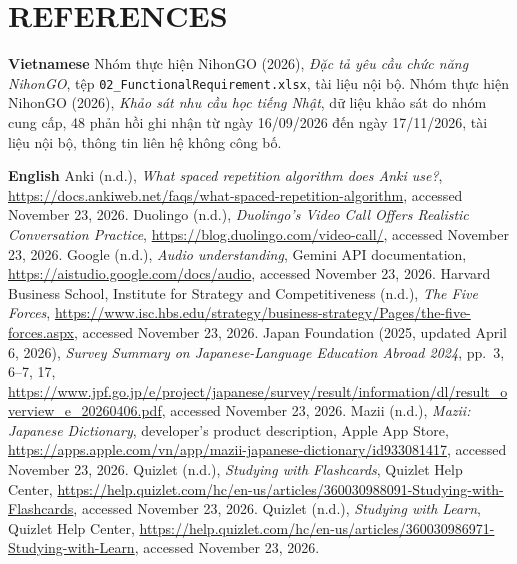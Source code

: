 {}
\chapter*{REFERENCES}

\begin{refslist}
  \item[] \hspace*{-0.68cm}\textbf{Vietnamese}
   Nhóm thực hiện NihonGO (2026),
    \textit{Đặc tả yêu cầu chức năng NihonGO}, tệp
    \nolinkurl{02_FunctionalRequirement.xlsx}, tài liệu nội bộ.
   Nhóm thực hiện NihonGO (2026),
    \textit{Khảo sát nhu cầu học tiếng Nhật}, dữ liệu khảo sát do nhóm
    cung cấp, 48 phản hồi ghi nhận từ ngày 16/09/2026 đến ngày 17/11/2026,
    tài liệu nội bộ, thông tin liên hệ không công bố.

  \item[] \hspace*{-0.68cm}\textbf{English}
   Anki (n.d.),
    \textit{What spaced repetition algorithm does Anki use?},
    \url{https://docs.ankiweb.net/faqs/what-spaced-repetition-algorithm},
    accessed November 23, 2026.
   Duolingo (n.d.),
    \textit{Duolingo's Video Call Offers Realistic Conversation Practice},
    \url{https://blog.duolingo.com/video-call/},
    accessed November 23, 2026.
   Google (n.d.),
    \textit{Audio understanding}, Gemini API documentation,
    \url{https://aistudio.google.com/docs/audio},
    accessed November 23, 2026.
   Harvard Business School,
    Institute for Strategy and Competitiveness (n.d.),
    \textit{The Five Forces},
    \url{https://www.isc.hbs.edu/strategy/business-strategy/Pages/the-five-forces.aspx},
    accessed November 23, 2026.
   Japan Foundation (2025, updated April 6, 2026),
    \textit{Survey Summary on Japanese-Language Education Abroad 2024},
    pp.~3, 6--7, 17,
    \url{https://www.jpf.go.jp/e/project/japanese/survey/result/information/dl/result_overview_e_20260406.pdf},
    accessed November 23, 2026.
   Mazii (n.d.),
    \textit{Mazii: Japanese Dictionary}, developer's product description,
    Apple App Store,
    \url{https://apps.apple.com/vn/app/mazii-japanese-dictionary/id933081417},
    accessed November 23, 2026.
   Quizlet (n.d.),
    \textit{Studying with Flashcards}, Quizlet Help Center,
    \url{https://help.quizlet.com/hc/en-us/articles/360030988091-Studying-with-Flashcards},
    accessed November 23, 2026.
   Quizlet (n.d.),
    \textit{Studying with Learn}, Quizlet Help Center,
    \url{https://help.quizlet.com/hc/en-us/articles/360030986971-Studying-with-Learn},
    accessed November 23, 2026.
\end{refslist}
